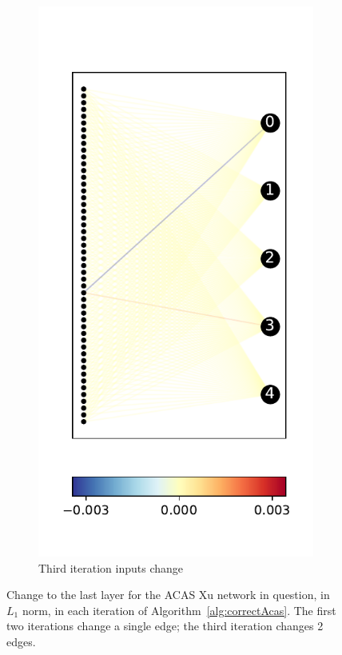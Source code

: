 \documentclass{easychair}
\begin{document}
\begin{figure}
\begin{subfigure}{0.2\linewidth}
  \includegraphics[width=\linewidth]{./images/ACASXU_2_9_all1_vals.pdf}
  \caption{Third iteration inputs change}
\end{subfigure}
\caption{Change to the last layer for the ACAS Xu network in question,
  in $L_1$ norm,
  in each iteration of Algorithm~\ref{alg:correctAcas}. The first two
  iterations change a single edge; the third iteration changes 2 edges.}
\label{fig:lastLayerACASXU}
\end{figure}
\end{document}
